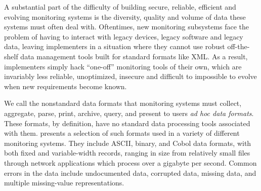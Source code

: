 \documentclass[10pt]{article}
\begin{document}
A substantial part of the difficulty of building secure, reliable, efficient
and evolving monitoring systems is the diversity, quality and volume of data
these systems must often deal with.  Oftentimes, new monitoring
subsystems face the problem of having to interact with legacy devices,
legacy software and legacy data, leaving implementers in a situation
where they cannot use robust off-the-shelf data management tools built for
standard formats like XML.  As a result, implementers simply
hack ``one-off'' monitoring tools of their own, which are invariably
less reliable, unoptimized, insecure and difficult to impossible to evolve
when new requirements become known.

We call the nonstandard data formats that monitoring systems must
collect, aggregate, parse, print, archive, query, and present to 
users {\em ad hoc data formats}.   These formats, by definition,
have no standard data processing tools associated with them.
 presents a selection of such formats
used in a variety of different monitoring systems.
They include ASCII, binary, and Cobol data formats, with
both fixed and variable-width records, ranging in size from
relatively small files through network applications which process over
a gigabyte per second.  Common errors in the data include undocumented data,
corrupted data, missing data, and multiple missing-value
representations.
\end{document}
